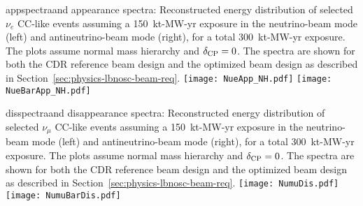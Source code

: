 \begin{cdrfigure}{appspectra}{\nue and \anue appearance spectra: Reconstructed energy distribution of selected $\nu_e$ CC-like events assuming a 150~kt-MW-yr exposure in the neutrino-beam mode (left) and antineutrino-beam mode (right), for a total 300~kt-MW-yr exposure.  The plots assume normal mass hierarchy and $\mdeltacp = 0$.  The spectra are shown for both the CDR reference beam design and the optimized beam design as described in Section~\ref{sec:physics-lbnosc-beam-req}.}
 \texttt{[image: NueApp\_NH.pdf]}
 \texttt{[image: NueBarApp\_NH.pdf]}
\end{cdrfigure}

\begin{cdrfigure}{disspectra}{\numu and \anumu disappearance spectra: Reconstructed energy distribution of selected $\nu_{\mu}$ CC-like events assuming a 150~kt-MW-yr exposure in the neutrino-beam mode (left) and antineutrino-beam mode (right), for a total 300~kt-MW-yr exposure.  The plots assume normal mass hierarchy and $\mdeltacp = 0$.  The spectra are shown for both the CDR reference beam design and the optimized beam design as described in Section~\ref{sec:physics-lbnosc-beam-req}.}
 \texttt{[image: NumuDis.pdf]}
 \texttt{[image: NumuBarDis.pdf]}
\end{cdrfigure}

